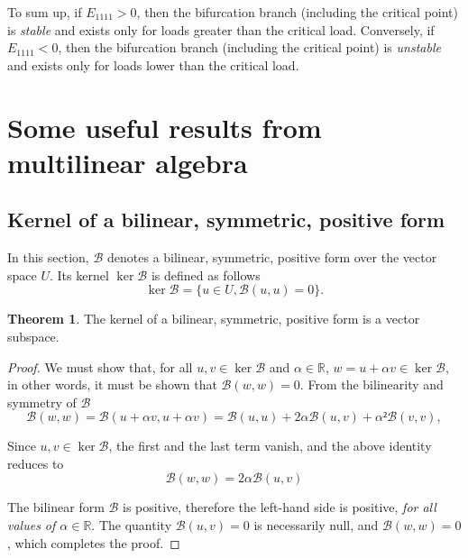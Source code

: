 \documentclass[12pt, final]{scrartcl}
\theoremstyle{definition}
\newtheorem{theorem}{Theorem}
\newcommand{\reals}{\mathbb{R}}
\begin{document}
To sum up, if $E_{1111} > 0$, then the bifurcation branch (including the
critical point) is \emph{stable} and exists only for loads greater than the
critical load. Conversely, if $E_{1111} < 0$, then the bifurcation branch
(including the critical point) is \emph{unstable} and exists only for loads
lower than the critical load.

\appendix

\section{Some useful results from multilinear algebra}

\subsection{Kernel of a bilinear, symmetric, positive form}

In this section, $\mathcal{B}$ denotes a bilinear, symmetric, positive form
over the vector space $U$. Its kernel $\ker \mathcal{B}$ is defined as
follows
\begin{equation}
 \ker \mathcal{B}= \bigl\{ u \in U, \mathcal{B}(u, u) = 0 \bigr\} .
\end{equation}

\begin{theorem}
  The kernel of a bilinear, symmetric, positive form is a vector subspace.
\end{theorem}
\begin{proof}
  We must show that, for all $u, v \in\ker \mathcal{B}$ and $α \in \reals$,
  $w = u + α v \in \ker \mathcal{B}$, in other words, it must be shown that
  $\mathcal{B}(w, w) = 0$. From the bilinearity and symmetry of
  $\mathcal{B}$
 \begin{equation*}
   \mathcal{B}(w, w) = \mathcal{B}(u + α v, u + α v)
   = \mathcal{B}(u, u) + 2 α \mathcal{B}(u, v) + α² \mathcal{B}(v, v),
 \end{equation*}

 Since $u, v \in \ker\mathcal{B}$, the first and the last term vanish, and the above identity reduces to
 \begin{equation*}
   \mathcal{B}(w, w) = 2α \mathcal{B}(u, v)
 \end{equation*}

 The bilinear form $\mathcal{B}$ is positive, therefore the left-hand side is
 positive, \emph{for all values of $α \in \reals$}. The quantity
 $\mathcal{B}(u, v) = 0$ is necessarily null, and $\mathcal{B}(w, w) = 0$,
 which completes the proof.
\end{proof}
\end{document}
